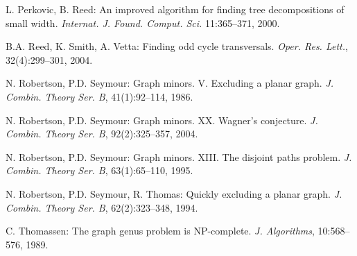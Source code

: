 \documentclass{llncs}
\begin{document}
\begin{thebibliography}{99}
L. Perkovic, B. Reed:
An improved algorithm for finding tree decompositions of small width.
\emph{Internat. J. Found. Comput. Sci.} 11:365--371, 2000.

B.A. Reed, K. Smith, A. Vetta: Finding odd cycle transversals.
\emph{Oper. Res. Lett.}, 32(4):299--301, 2004.

N. Robertson, P.D. Seymour:
Graph minors. V. Excluding a planar graph.
\emph{J. Combin. Theory Ser. B}, 41(1):92--114, 1986.

N. Robertson, P.D. Seymour:
Graph minors. XX. Wagner's conjecture.
\emph{J. Combin. Theory Ser. B}, 92(2):325--357, 2004.

N. Robertson, P.D. Seymour:
Graph minors. XIII. The disjoint paths problem.
\emph{J. Combin. Theory Ser. B}, 63(1):65--110, 1995.

N. Robertson, P.D. Seymour, R. Thomas:
Quickly excluding a planar graph.
\emph{J. Combin. Theory Ser. B}, 62(2):323--348, 1994.

C. Thomassen:
The graph genus problem is NP-complete.
\emph{J. Algorithms}, 10:568--576, 1989.

\end{thebibliography}
\end{document}
